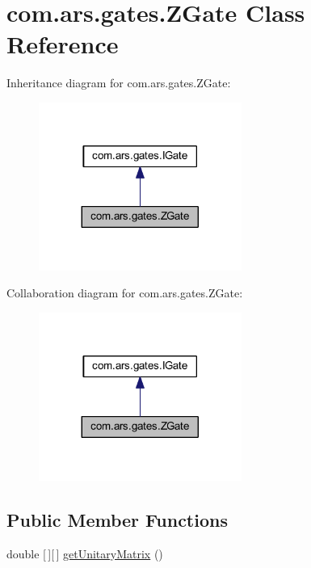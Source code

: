 \hypertarget{classcom_1_1ars_1_1gates_1_1_z_gate}{}\section{com.\+ars.\+gates.\+Z\+Gate Class Reference}
\label{classcom_1_1ars_1_1gates_1_1_z_gate}


Inheritance diagram for com.\+ars.\+gates.\+Z\+Gate\+:\nopagebreak
\begin{figure}[H]
\begin{center}
\leavevmode
\includegraphics[width=188pt]{classcom_1_1ars_1_1gates_1_1_z_gate__inherit__graph}
\end{center}
\end{figure}


Collaboration diagram for com.\+ars.\+gates.\+Z\+Gate\+:\nopagebreak
\begin{figure}[H]
\begin{center}
\leavevmode
\includegraphics[width=188pt]{classcom_1_1ars_1_1gates_1_1_z_gate__coll__graph}
\end{center}
\end{figure}
\subsection*{Public Member Functions}
\begin{DoxyCompactItemize}
\item 
double \mbox{[}$\,$\mbox{]}\mbox{[}$\,$\mbox{]} \hyperlink{classcom_1_1ars_1_1gates_1_1_z_gate_a1009d3144a50f50332e64b6e7f37b578}{get\+Unitary\+Matrix} ()
\end{DoxyCompactItemize}


